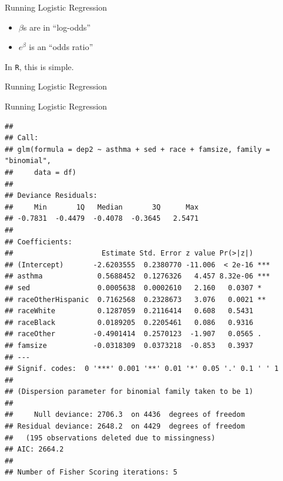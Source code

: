 \begin{frame}[fragile]{Running Logistic Regression}

\Large

\begin{itemize}
\tightlist
\item
  \(\beta\)s are in ``log-odds''
\item
  \(e^{\beta}\) is an ``odds ratio''
\end{itemize}

In \texttt{R}, this is simple.

\end{frame}

\begin{frame}[fragile]{Running Logistic Regression}

\large

\begin{Shaded}
\begin{Highlighting}[]
\StringTok{ }\OperatorTok{~}\StringTok{ }\OperatorTok{+}\StringTok{ }\OperatorTok{+}\StringTok{ }\OperatorTok{+}\StringTok{ }
              \NormalTok{)}
\end{Highlighting}
\end{Shaded}

\end{frame}

\begin{frame}[fragile]{Running Logistic Regression}

\small

\begin{verbatim}
## 
## Call:
## glm(formula = dep2 ~ asthma + sed + race + famsize, family = "binomial", 
##     data = df)
## 
## Deviance Residuals: 
##     Min       1Q   Median       3Q      Max  
## -0.7831  -0.4479  -0.4078  -0.3645   2.5471  
## 
## Coefficients:
##                     Estimate Std. Error z value Pr(>|z|)    
## (Intercept)       -2.6203555  0.2380770 -11.006  < 2e-16 ***
## asthma             0.5688452  0.1276326   4.457 8.32e-06 ***
## sed                0.0005638  0.0002610   2.160   0.0307 *  
## raceOtherHispanic  0.7162568  0.2328673   3.076   0.0021 ** 
## raceWhite          0.1287059  0.2116414   0.608   0.5431    
## raceBlack          0.0189205  0.2205461   0.086   0.9316    
## raceOther         -0.4901414  0.2570123  -1.907   0.0565 .  
## famsize           -0.0318309  0.0373218  -0.853   0.3937    
## ---
## Signif. codes:  0 '***' 0.001 '**' 0.01 '*' 0.05 '.' 0.1 ' ' 1
## 
## (Dispersion parameter for binomial family taken to be 1)
## 
##     Null deviance: 2706.3  on 4436  degrees of freedom
## Residual deviance: 2648.2  on 4429  degrees of freedom
##   (195 observations deleted due to missingness)
## AIC: 2664.2
## 
## Number of Fisher Scoring iterations: 5
\end{verbatim}

\Large

\end{frame}

